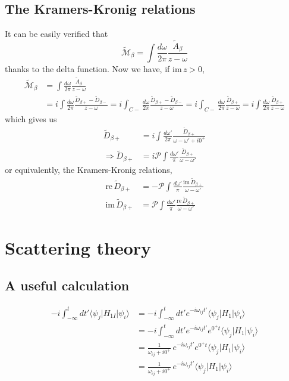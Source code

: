 \documentclass[12pt, oneside]{book}
\begin{document}
\section*{The Kramers-Kronig relations}
It can be easily verified that
\[
\widetilde{\mathcal{M}}_{\beta}=\int\frac{d\omega}{2\pi}\frac{\widetilde{A}_{\beta}}{z-\omega}
\]
thanks to the delta function. Now we have, if $\text{im}\,z>0$,
\begin{align*}
\widetilde{\mathcal{M}}_{\beta}
&=\int\frac{d\omega}{2\pi}\frac{\widetilde{A}_{\beta}}{z-\omega}\\
&=i\int\frac{d\omega}{2\pi}\frac{\widetilde{D}_{\beta+}-\widetilde{D}_{\beta-}}{z-\omega}=i\int_{C-}\frac{d\omega}{2\pi}\frac{\widetilde{D}_{\beta+}-\widetilde{D}_{\beta-}}{z-\omega}=i\int_{C-}\frac{d\omega}{2\pi}\frac{\widetilde{D}_{\beta+}}{z-\omega}=i\int\frac{d\omega}{2\pi}\frac{\widetilde{D}_{\beta+}}{z-\omega}
\end{align*}
which gives us
\begin{align*}
\widetilde{D}_{\beta+}&=i\int\frac{d\omega'}{2\pi}\frac{\widetilde{D}_{\beta+}}{\omega-\omega'+i0^+}\\
\Rightarrow
\widetilde{D}_{\beta+}&=i\mathcal{P}\int\frac{d\omega'}{\pi}\frac{\widetilde{D}_{\beta+}}{\omega-\omega'}
\end{align*}
or equivalently, the Kramers-Kronig relations,
\begin{align*}
\text{re}\,\widetilde{D}_{\beta+}&=-\mathcal{P}\int\frac{d\omega'}{\pi}\frac{\text{im}\,\widetilde{D}_{\beta+}}{\omega-\omega'}\\
\text{im}\,\widetilde{D}_{\beta+}&=\mathcal{P}\int\frac{d\omega'}{\pi}\frac{\text{re}\,\widetilde{D}_{\beta+}}{\omega-\omega'}
\end{align*}

\chapter{Scattering theory}
\section*{A useful calculation}
\begin{align*}
-i\int_{-\infty}^tdt'\langle\psi_j|H_{1I}|\psi_i\rangle
&=-i\int_{-\infty}^tdt'e^{-i\omega_{ij}t'}\langle\psi_j|H_1|\psi_i\rangle\\
&=-i\int_{-\infty}^tdt'e^{-i\omega_{ij}t'}e^{0^+t}\langle\psi_j|H_1|\psi_i\rangle\\
&=\frac1{\omega_{ij}+i0^+}\,e^{-i\omega_{ij}t'}e^{0^+t}\langle\psi_j|H_1|\psi_i\rangle\\
&=\frac1{\omega_{ij}+i0^+}\,e^{-i\omega_{ij}t'}\langle\psi_j|H_1|\psi_i\rangle
\end{align*}
\end{document}
